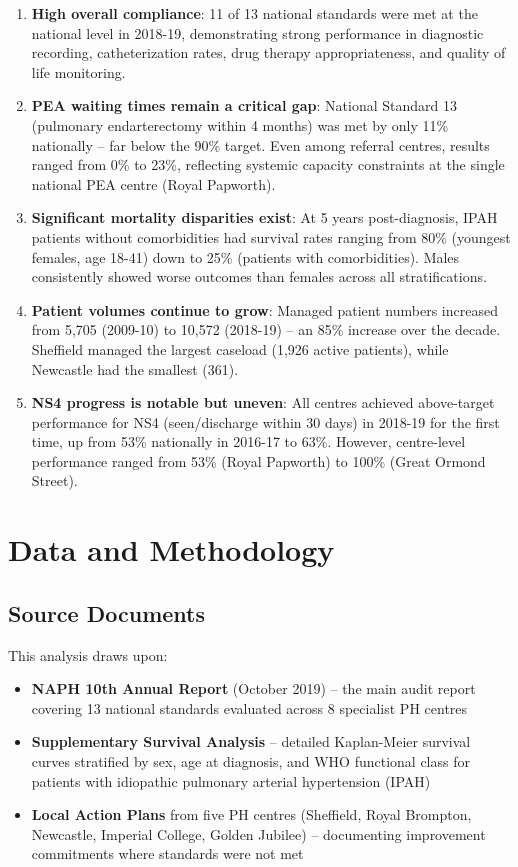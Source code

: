 \documentclass[12pt,a4paper]{article}
\begin{document}
\begin{enumerate}
    \item \textbf{High overall compliance}: 11 of 13 national standards were met at the national level in 2018-19, demonstrating strong performance in diagnostic recording, catheterization rates, drug therapy appropriateness, and quality of life monitoring.
    
    \item \textbf{PEA waiting times remain a critical gap}: National Standard 13 (pulmonary endarterectomy within 4 months) was met by only 11\% nationally -- far below the 90\% target. Even among referral centres, results ranged from 0\% to 23\%, reflecting systemic capacity constraints at the single national PEA centre (Royal Papworth).
    
    \item \textbf{Significant mortality disparities exist}: At 5 years post-diagnosis, IPAH patients without comorbidities had survival rates ranging from 80\% (youngest females, age 18-41) down to 25\% (patients with comorbidities). Males consistently showed worse outcomes than females across all stratifications.
    
    \item \textbf{Patient volumes continue to grow}: Managed patient numbers increased from 5,705 (2009-10) to 10,572 (2018-19) -- an 85\% increase over the decade. Sheffield managed the largest caseload (1,926 active patients), while Newcastle had the smallest (361).
    
    \item \textbf{NS4 progress is notable but uneven}: All centres achieved above-target performance for NS4 (seen/discharge within 30 days) in 2018-19 for the first time, up from 53\% nationally in 2016-17 to 63\%. However, centre-level performance ranged from 53\% (Royal Papworth) to 100\% (Great Ormond Street).
\end{enumerate}

\section{Data and Methodology}

\subsection{Source Documents}
This analysis draws upon:
\begin{itemize}
    \item \textbf{NAPH 10th Annual Report} (October 2019) -- the main audit report covering 13 national standards evaluated across 8 specialist PH centres
    \item \textbf{Supplementary Survival Analysis} -- detailed Kaplan-Meier survival curves stratified by sex, age at diagnosis, and WHO functional class for patients with idiopathic pulmonary arterial hypertension (IPAH)
    \item \textbf{Local Action Plans} from five PH centres (Sheffield, Royal Brompton, Newcastle, Imperial College, Golden Jubilee) -- documenting improvement commitments where standards were not met
\end{itemize}
\end{document}

